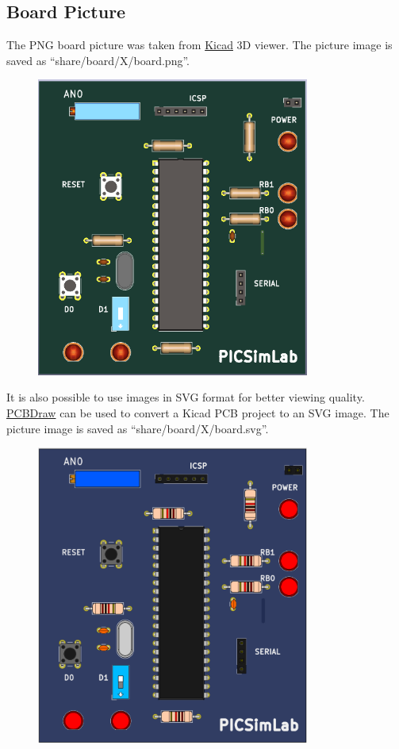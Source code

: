 \pagebreak
\subsection{Board Picture}

The PNG board picture was taken from \href{http://kicad-pcb.org/}{Kicad} 3D viewer.
The picture image is saved as ``share/board/X/board.png''.

\begin{figure}[H]
\center
\includegraphics[width=0.8\textwidth]{files/share/board.png} 
\end{figure} 

It is also possible to use images in SVG format for better viewing quality. 
\href{https://github.com/yaqwsx/PcbDraw}{PCBDraw} can be used to convert a Kicad PCB project to 
an SVG image. 
The picture image is saved as ``share/board/X/board.svg''.
\begin{figure}[H]
\center
\includegraphics[width=0.8\textwidth]{files/share/board_svg.png} 
\end{figure} 

